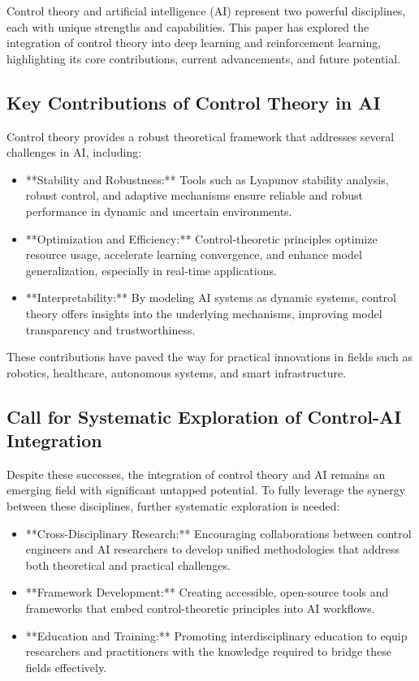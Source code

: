 \documentclass{IEEEojcsys}
\begin{document}
Control theory and artificial intelligence (AI) represent two powerful disciplines, each with unique strengths and capabilities. This paper has explored the integration of control theory into deep learning and reinforcement learning, highlighting its core contributions, current advancements, and future potential.

\subsection{Key Contributions of Control Theory in AI}
Control theory provides a robust theoretical framework that addresses several challenges in AI, including:
\begin{itemize}
    \item **Stability and Robustness:** Tools such as Lyapunov stability analysis, robust control, and adaptive mechanisms ensure reliable and robust performance in dynamic and uncertain environments.
    \item **Optimization and Efficiency:** Control-theoretic principles optimize resource usage, accelerate learning convergence, and enhance model generalization, especially in real-time applications.
    \item **Interpretability:** By modeling AI systems as dynamic systems, control theory offers insights into the underlying mechanisms, improving model transparency and trustworthiness.
\end{itemize}
These contributions have paved the way for practical innovations in fields such as robotics, healthcare, autonomous systems, and smart infrastructure.

\subsection{Call for Systematic Exploration of Control-AI Integration}
Despite these successes, the integration of control theory and AI remains an emerging field with significant untapped potential. To fully leverage the synergy between these disciplines, further systematic exploration is needed:
\begin{itemize}
    \item **Cross-Disciplinary Research:** Encouraging collaborations between control engineers and AI researchers to develop unified methodologies that address both theoretical and practical challenges.
    \item **Framework Development:** Creating accessible, open-source tools and frameworks that embed control-theoretic principles into AI workflows.
    \item **Education and Training:** Promoting interdisciplinary education to equip researchers and practitioners with the knowledge required to bridge these fields effectively.
\end{itemize}
\end{document}
